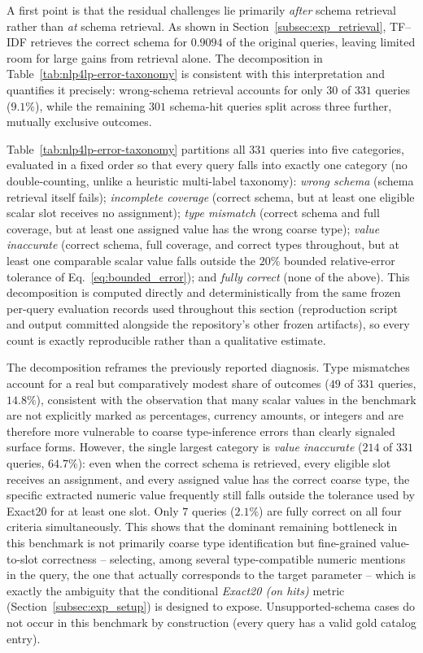 \documentclass[pdflatex,sn-basic,Numbered]{sn-jnl}
\begin{document}
A first point is that the residual challenges lie primarily \emph{after} schema retrieval rather than \emph{at} schema retrieval. As shown in Section~\ref{subsec:exp_retrieval}, TF--IDF retrieves the correct schema for $0.9094$ of the original queries, leaving limited room for large gains from retrieval alone. The decomposition in Table~\ref{tab:nlp4lp-error-taxonomy} is consistent with this interpretation and quantifies it precisely: wrong-schema retrieval accounts for only $30$ of $331$ queries ($9.1\%$), while the remaining $301$ schema-hit queries split across three further, mutually exclusive outcomes.

Table~\ref{tab:nlp4lp-error-taxonomy} partitions all $331$ queries into five categories, evaluated in a fixed order so that every query falls into exactly one category (no double-counting, unlike a heuristic multi-label taxonomy): \emph{wrong schema} (schema retrieval itself fails); \emph{incomplete coverage} (correct schema, but at least one eligible scalar slot receives no assignment); \emph{type mismatch} (correct schema and full coverage, but at least one assigned value has the wrong coarse type); \emph{value inaccurate} (correct schema, full coverage, and correct types throughout, but at least one comparable scalar value falls outside the $20\%$ bounded relative-error tolerance of Eq.~\eqref{eq:bounded_error}); and \emph{fully correct} (none of the above). This decomposition is computed directly and deterministically from the same frozen per-query evaluation records used throughout this section (reproduction script and output committed alongside the repository's other frozen artifacts), so every count is exactly reproducible rather than a qualitative estimate.

The decomposition reframes the previously reported diagnosis. Type mismatches account for a real but comparatively modest share of outcomes ($49$ of $331$ queries, $14.8\%$), consistent with the observation that many scalar values in the benchmark are not explicitly marked as percentages, currency amounts, or integers and are therefore more vulnerable to coarse type-inference errors than clearly signaled surface forms. However, the single largest category is \emph{value inaccurate} ($214$ of $331$ queries, $64.7\%$): even when the correct schema is retrieved, every eligible slot receives an assignment, and every assigned value has the correct coarse type, the specific extracted numeric value frequently still falls outside the tolerance used by Exact20 for at least one slot. Only $7$ queries ($2.1\%$) are fully correct on all four criteria simultaneously. This shows that the dominant remaining bottleneck in this benchmark is not primarily coarse type identification but fine-grained value-to-slot correctness -- selecting, among several type-compatible numeric mentions in the query, the one that actually corresponds to the target parameter -- which is exactly the ambiguity that the conditional \textit{Exact20 (on hits)} metric (Section~\ref{subsec:exp_setup}) is designed to expose. Unsupported-schema cases do not occur in this benchmark by construction (every query has a valid gold catalog entry).
\end{document}
